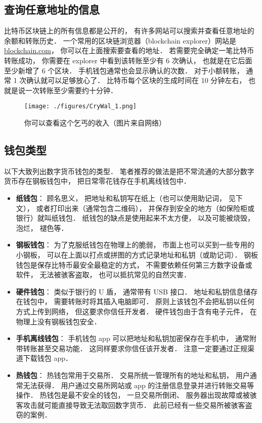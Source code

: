 \subsection{查询任意地址的信息}
比特币区块链上的所有信息都是公开的， 有许多网站可以搜索并查看任意地址的余额和转账历史． 一个常用的区块链浏览器（blockchain explorer）网站是 \href{https://blockchain.com}{blockchain.com}， 你可以在上面搜索要查看的地址． 若需要完全确定一笔比特币转账成功， 你需要在 explorer 中看到该转账至少有 6 次确认， 也就是在它后面至少新增了 6 个区块． 手机钱包通常也会显示确认的次数． 对于小额转账， 通常 1 次确认就可以足够放心了． 比特币每个区块的生成时间在 10 分钟左右， 也就是说一次转账至少需要约十分钟．
\begin{figure}[ht]
\centering
\texttt{[image: ./figures/CryWal\_1.png]}
\caption{你可以查看这个乞丐的收入（图片来自网络）} \label{CryWal_fig1}
\end{figure}

\subsection{钱包类型}
以下大致列出数字货币钱包的类型． 笔者推荐的做法是把不常流通的大部分数字货币存在钢板钱包中， 把日常零花钱存在手机离线钱包中．
\begin{itemize}
\item \textbf{纸钱包}： 顾名思义， 把地址和私钥写在纸上（也可以使用助记词， 见下文）， 或者打印出来（通常包含二维码）， 并保存到安全的地方（如保险柜或银行）就叫纸钱包． 纸钱包的缺点是使用起来不太方便， 以及可能被烧毁， 泡烂， 褪色等．
\item \textbf{钢板钱包}： 为了克服纸钱包在物理上的脆弱， 市面上也可以买到一些专用的小钢板， 可以在上面以打点或拼图的方式记录地址和私钥（或助记词）． 钢板钱包是保存比特币最安全最稳定的方式， 不需要依赖任何第三方数字设备或软件， 无法被骇客盗取， 也可以抵抗常见的自然灾害．
\item \textbf{硬件钱包}： 类似于银行的 U 盾， 通常带有 USB 接口． 地址和私钥信息储存在钱包中， 需要转账时将其插入电脑即可． 原则上该钱包不会把私钥以任何方式上传到网络， 但这要求你信任开发者． 硬件钱包由于含有电子元件， 在物理上没有钢板钱包安全．
\item \textbf{手机离线钱包}： 手机钱包 app 可以把地址和私钥加密保存在手机中， 通常附带转账甚至交易功能． 这同样要求你信任该开发者． 注意一定要通过正规渠道下载钱包 app．
\item \textbf{热钱包}： 热钱包常用于交易所． 交易所统一管理所有的地址和私钥， 用户通常无法获得． 用户通过交易所网站或 app 的注册信息登录并进行转账交易等操作． 热钱包是最不安全的钱包， 一旦交易所倒闭、 服务器出现故障或被骇客攻击就可能直接导致无法取回数字货币． 此前已经有一些交易所被骇客盗窃的案例．
\end{itemize}

